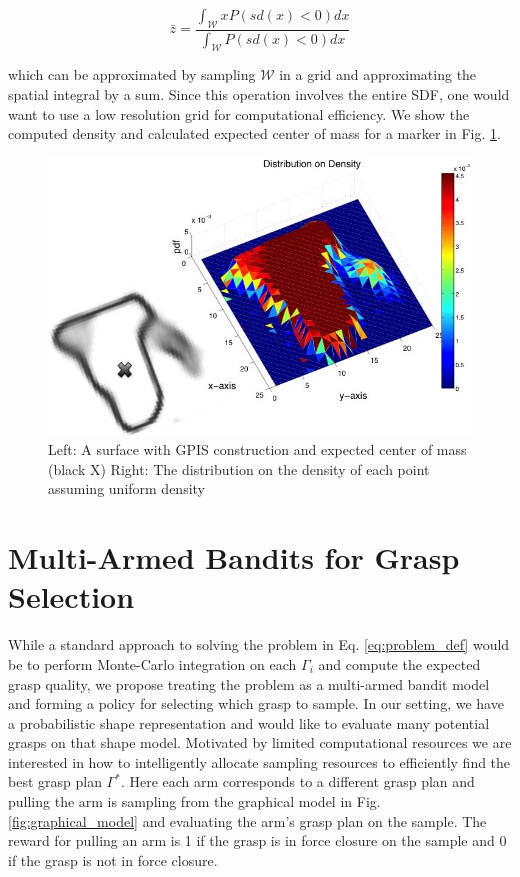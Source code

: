 \documentclass[letterpaper, 10 pt, conference]{ieeeconf}  %
\begin{document}
\label{eq:mass}
\begin{equation}
  \bar{z} 
  =
  \frac
    {\int_{\mathcal{W}}x P(sd(x)<0) dx}
    {\int_{\mathcal{W}}  P(sd(x)<0) dx}
\end{equation}

which can be approximated by sampling $\mathcal{W}$ in a grid and approximating the spatial integral by a sum. Since this operation involves the entire SDF, one would want to use a low resolution grid for computational efficiency. We show the computed density and calculated expected center of mass for a marker in Fig. \ref{fig:GPIS_MASS}.


\begin{figure}[ht!]
\centering
\includegraphics[scale = 0.3]{figures/Slide06.jpg}
\caption{ \footnotesize Left: A surface with GPIS construction and expected center of mass (black X)
Right: The distribution on the density of each point assuming uniform density}
\vspace*{-10pt}
\label{fig:GPIS_MASS}
\end{figure}


\section{Multi-Armed Bandits for Grasp Selection}
While a standard approach to solving the problem in Eq. \ref{eq:problem_def} would be to perform Monte-Carlo integration on each $\Gamma_i$ and compute the expected grasp quality, we propose treating the problem as a multi-armed bandit model and forming a policy for selecting which grasp to sample. 
In our setting, we have a probabilistic shape representation and would like to evaluate many potential grasps on that shape model.
Motivated by limited computational resources we are interested in how to intelligently allocate sampling resources to efficiently find the best grasp plan $\Gamma^*$.
Here each arm corresponds to a different grasp plan and pulling the arm is sampling from the graphical model in Fig. \ref{fig:graphical_model} and evaluating the arm's grasp plan on the sample.
The reward for pulling an arm is 1 if the grasp is in force closure on the sample and 0 if the grasp is not in force closure. 
\end{document}
